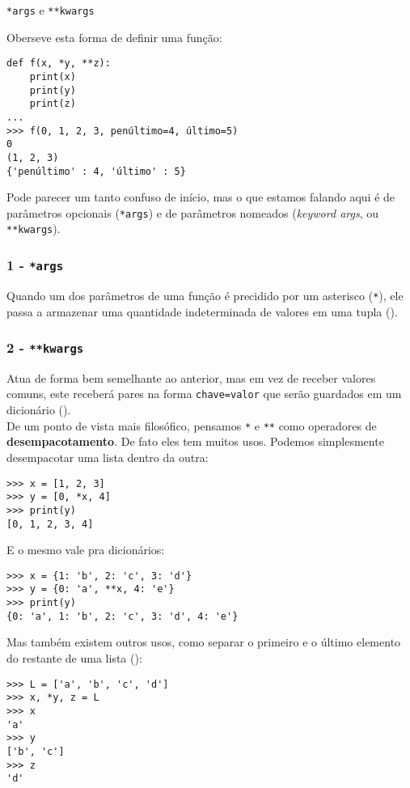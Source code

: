 \documentclass[12pt]{article}
\begin{document}
	\begin{interlude}{\texttt{*args} e \texttt{**kwargs}}
	
	Oberseve esta forma de definir uma função:
	\begin{lstlisting}
def f(x, *y, **z):
	print(x)
	print(y)
	print(z)
...
>>> f(0, 1, 2, 3, penúltimo=4, último=5)
0
(1, 2, 3)
{'penúltimo' : 4, 'último' : 5}
	\end{lstlisting}
	
	Pode parecer um tanto confuso de início, mas o que estamos falando aqui é de parâmetros opcionais (\texttt{*args}) e de parâmetros nomeados (\textit{keyword args}, ou \texttt{**kwargs}).
	
	\subsubsection*{1 - \texttt{*args}}
	
	Quando um dos parâmetros de uma função é precidido por um asterisco (\texttt{*}), ele passa a armazenar uma quantidade indeterminada de valores em uma tupla ().
	
	\subsubsection*{2 - \texttt{**kwargs}}
	
	Atua de forma bem semelhante ao anterior, mas em vez de receber valores comuns, este receberá pares na forma \texttt{chave=valor} que serão guardados em um dicionário ().\\
	
	De um ponto de vista mais filosófico, pensamos \texttt{*} e \texttt{**} como operadores de \textbf{desempacotamento}. De fato eles tem muitos usos. Podemos simplesmente desempacotar uma lista dentro da outra:
	
	\begin{lstlisting}
>>> x = [1, 2, 3]
>>> y = [0, *x, 4]
>>> print(y)
[0, 1, 2, 3, 4]
	\end{lstlisting}
	
	E o mesmo vale pra dicionários:
	
	\begin{lstlisting}
>>> x = {1: 'b', 2: 'c', 3: 'd'}
>>> y = {0: 'a', **x, 4: 'e'}
>>> print(y)
{0: 'a', 1: 'b', 2: 'c', 3: 'd', 4: 'e'}
	\end{lstlisting}
	
	Mas também existem outros usos, como separar o primeiro e o último elemento do restante de uma lista ():
	
	\begin{lstlisting}
>>> L = ['a', 'b', 'c', 'd']
>>> x, *y, z = L
>>> x
'a'
>>> y
['b', 'c']
>>> z
'd' 
	\end{lstlisting}
	
	\end{interlude}
	
\end{document}
